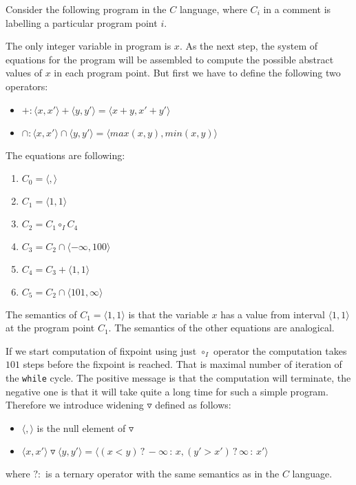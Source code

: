 \documentclass[a4paper, 12pt]{article}
\newcommand{\interval}[2]{\langle #1,#2 \rangle}
\newcommand{\ajoin}[0]{\circ}
\newcommand{\wid}[0]{\triangledown}
\newcommand{\iintg}[0]{I}
\newcommand{\ijoin}[0]{\ajoin_\iintg}
\begin{document}
Consider the following program in the $C$ language, where $C_i$ in a comment is labelling
a particular program point $i$.



The only integer variable in program is $x$. As the next step,
the system of equations for the program will be assembled
to compute the possible abstract values of $x$ in each program point.
But first we have to define the following two operators:
\begin{itemize}
	\item $+: \interval{x}{x'} + \interval{y}{y'} = \interval{x+y}{x'+y'}$
	\item $\cap: \interval{x}{x'} \cap \interval{y}{y'} = \interval{max(x,y)}{min(x,y)}$
\end{itemize}

The equations are following:
\begin{enumerate}
	\item $C_0 = \interval{}{}$
	\item $C_1 = \interval{1}{1}$
	\item $C_2 = C_1 \ijoin C_4$
	\item $C_3 = C_2 \cap \interval{-\infty}{100}$
	\item $C_4 = C_3 + \interval{1}{1}$
	\item $C_5 = C_2 \cap \interval{101}{\infty}$
\end{enumerate}

The semantics of $C_1 = \interval{1}{1}$ is that the variable $x$ has a value from interval $\interval{1}{1}$
at the program point $C_1$. The semantics of the other equations are analogical.

If we start computation of fixpoint using just $\ijoin$ operator the computation takes $101$ steps
before the fixpoint is reached.
That is maximal number of iteration of the \texttt{while} cycle.
The positive message is that the computation will terminate, the negative one
is that it will take quite a long time for such a simple program.
Therefore we introduce widening $\wid$ defined as follows:
\begin{itemize}
	\item $\interval{}{}$ is the null element of $\wid$
	\item $\interval{x}{x'} \wid \interval{y}{y'} = \interval{(x < y)\,?\,-\infty\,:\,x}{(y' > x')\,?\,\infty\,:\,x'}$
\end{itemize}
where $?:$ is a ternary operator with the same semantics as in the $C$ language.
\end{document}
